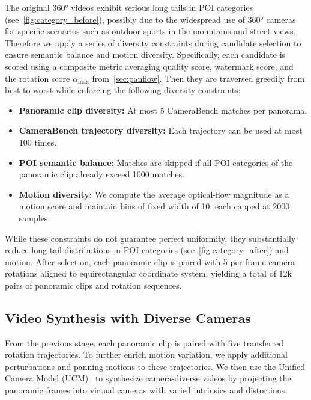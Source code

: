 The original 360° videos exhibit serious long tails in POI categories (see~\cref{fig:category_before}), possibly due to the widespread use of 360° cameras for specific scenarios such as outdoor sports in the mountains and street views.
Therefore we apply a series of diversity constraints during candidate selection to ensure semantic balance and motion diversity.
Specifically, each candidate is scored using a composite metric averaging quality score, watermark score, and the rotation score $\alpha_{\max}$ from~\cref{sec:panflow}.
Then they are traversed greedily from best to worst while enforcing the following diversity constraints:
\begin{itemize}
    \item \textbf{Panoramic clip diversity:} At most 5 CameraBench matches per panorama.
    \item \textbf{CameraBench trajectory diversity:} Each trajectory can be used at most 100 times.
    \item \textbf{POI semantic balance:} Matches are skipped if all POI categories of the panoramic clip already exceed 1000 matches.
    \item \textbf{Motion diversity:} We compute the average optical-flow magnitude as a motion score and maintain bins of fixed width of 10, each capped at 2000 samples.
\end{itemize}

While these constraints do not guarantee perfect uniformity, they substantially reduce long-tail distributions in POI categories (see~\cref{fig:category_after}) and motion.
After selection, each panoramic clip is paired with 5 per-frame camera rotations aligned to equirectangular coordinate system, yielding a total of 12k pairs of panoramic clips and rotation sequences.

\afterpage{
    \clearpage
    
    \newpage
    
    \clearpage
}

\subsection{Video Synthesis with Diverse Cameras}
\label{sec:syn_video}

From the previous stage, each panoramic clip is paired with five transferred rotation trajectories.  
To further enrich motion variation, we apply additional perturbations and panning motions to these trajectories.
We then use the Unified Camera Model (UCM)~\cite{mei2007single} to synthesize camera-diverse videos by projecting the panoramic frames into virtual cameras with varied intrinsics and distortions.


